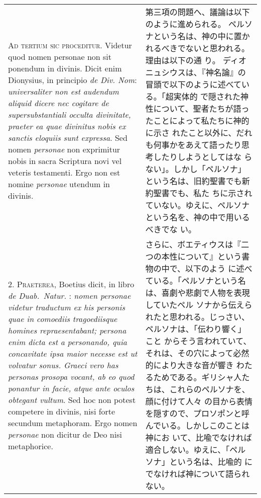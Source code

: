 \documentclass[10pt]{jsarticle} %
\begin{document}
\begin{longtable}{p{21em}p{21em}}
{\Huge A}{\scshape d tertium sic proceditur}. Videtur quod nomen personae non sit ponendum
in divinis. Dicit enim Dionysius, in principio {\itshape de
Div. Nom}: {\itshape universaliter non est audendum aliquid dicere nec cogitare de
supersubstantiali occulta divinitate, praeter ea quae divinitus nobis ex
sanctis eloquiis sunt expressa}. Sed nomen {\itshape personae} non exprimitur nobis
in sacra Scriptura novi vel veteris testamenti. Ergo non est nomine
{\itshape personae} utendum in divinis.


&

第三項の問題へ、議論は以下のように進められる。
ペルソナという名は、神の中に置かれるべきでないと思われる。理由は以下の通
 り。
ディオニュシウスは、『神名論』の冒頭で以下のように述べている。「超実体的
 で隠された神性について、聖者たちが語ったことによって私たちに神的に示さ
 れたこと以外に、だれも何事かをあえて語ったり思考したりしようとしてはな
 らない」。しかし「ペルソナ」という名は、旧約聖書でも新約聖書でも、私た
 ちに示されていない。ゆえに、ペルソナという名を、神の中で用いるべきでな
 い。


\\



2. {\scshape Praeterea}, Boetius dicit, in libro {\itshape de
 Duab.~Natur.} : {\itshape nomen personae
videtur traductum ex his personis quae in comoediis tragoediisque
homines repraesentabant; persona enim dicta est a personando, quia
concavitate ipsa maior necesse est ut volvatur sonus. Graeci vero has
personas prosopa vocant, ab eo quod ponantur in facie, atque ante oculos
obtegant vultum}. Sed hoc non potest competere in divinis, nisi forte
secundum metaphoram. Ergo nomen {\itshape personae} non dicitur de Deo
 nisi metaphorice.


&

さらに、ボエティウスは『二つの本性について』という書物の中で、以下のよう
 に述べている。「ペルソナという名は、喜劇や悲劇で人物を表現していたペル
 ソナから伝えられたと思われる。じっさい、ペルソナは、「伝わり響く」こと
 からそう言われていて、それは、その穴によって必然的により大きな音が響き
 わたるためである。ギリシャ人たちは、これらのペルソナを、顔に付けて人々
 の目から表情を隠すので、プロソポンと呼んでいる。しかしこのことは神にお
 いて、比喩でなければ適合しない。ゆえに、「ペルソナ」という名は、比喩的
 にでなければ神について語られない。


\\




\end{longtable}
\end{document}
